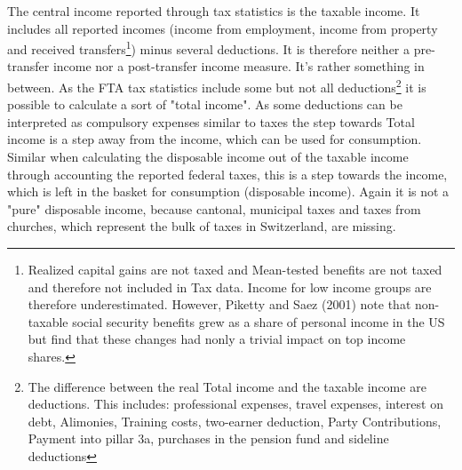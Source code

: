 \documentclass[twoside]{article}\usepackage[]{graphicx}\usepackage[]{color}
\begin{document}
\begin{multicols}{2}



The central income reported through tax statistics is the taxable income. It includes all reported incomes (income from employment, income from property and received transfers\footnote{Realized capital gains are not taxed and Mean-tested benefits are not taxed and therefore not included in Tax data. Income for low income groups are therefore underestimated. However, Piketty and Saez (2001) note that non-taxable social security benefits grew as a share of personal income in the US but find that these changes had nonly a trivial impact on top income shares.}) minus several deductions. It is therefore neither a pre-transfer income  nor a post-transfer income measure. It's rather something in between. As the FTA tax statistics include some but not all deductions\footnote{The difference between the real Total income and the taxable income are deductions. This includes: professional expenses, travel expenses, interest on debt, Alimonies, Training costs, two-earner deduction, Party Contributions, Payment into pillar 3a, purchases in the pension fund and sideline deductions} it is possible to calculate a sort of "total income". As some deductions can be interpreted as compulsory expenses similar to taxes the step towards Total income is a step away from the income, which can be used for consumption. Similar when calculating the disposable income out of the taxable income through accounting the reported federal taxes, this is a step towards the income, which is left in the basket for consumption (disposable income). Again it is not a "pure" disposable income, because cantonal, municipal taxes and taxes from churches, which represent the bulk of taxes in Switzerland, are missing.   \\   




\end{multicols}
\end{document}
